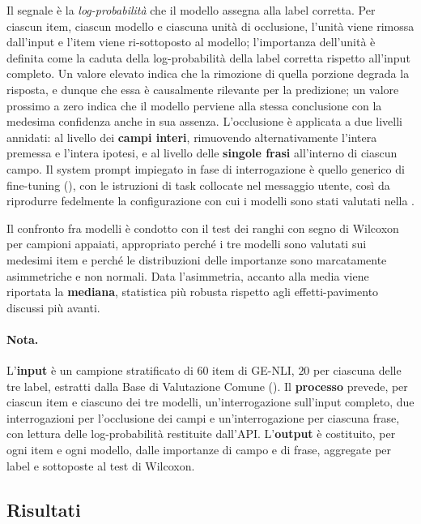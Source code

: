 \documentclass[pdflatex, sn-apa]{sn-jnl}%
\theoremstyle{thmstyleone}%
\theoremstyle{thmstyletwo}%
\theoremstyle{thmstylethree}%
\begin{document}
Il segnale è la \emph{log-probabilità} che il modello assegna alla label corretta.
Per ciascun item, ciascun modello e ciascuna unità di occlusione, l'unità viene
rimossa dall'input e l'item viene ri-sottoposto al modello; l'importanza
dell'unità è definita come la caduta della log-probabilità della label corretta
rispetto all'input completo. Un valore elevato indica che la rimozione di quella
porzione degrada la risposta, e dunque che essa è causalmente rilevante per la
predizione; un valore prossimo a zero indica che il modello perviene alla stessa
conclusione con la medesima confidenza anche in sua assenza. L'occlusione è
applicata a due livelli annidati: al livello dei \textbf{campi interi}, rimuovendo
alternativamente l'intera premessa e l'intera ipotesi, e al livello delle
\textbf{singole frasi} all'interno di ciascun campo. Il system prompt impiegato in
fase di interrogazione è quello generico di fine-tuning (), con le
istruzioni di task collocate nel messaggio utente, così da riprodurre fedelmente la
configurazione con cui i modelli sono stati valutati nella .

Il confronto fra modelli è condotto con il test dei ranghi con segno di Wilcoxon
per campioni appaiati, appropriato perché i tre modelli sono valutati sui medesimi
item e perché le distribuzioni delle importanze sono marcatamente asimmetriche e
non normali. Data l'asimmetria, accanto alla media viene riportata la
\textbf{mediana}, statistica più robusta rispetto agli effetti-pavimento discussi
più avanti.

\paragraph{Nota.}
L'\textbf{input} è un campione stratificato di $60$ item di GE-NLI, $20$ per
ciascuna delle tre label, estratti dalla Base di Valutazione Comune
(). Il \textbf{processo} prevede, per ciascun item e ciascuno
dei tre modelli, un'interrogazione sull'input completo, due interrogazioni per
l'occlusione dei campi e un'interrogazione per ciascuna frase, con lettura delle
log-probabilità restituite dall'API. L'\textbf{output} è costituito, per ogni item
e ogni modello, dalle importanze di campo e di frase, aggregate per label e
sottoposte al test di Wilcoxon.

\subsection{Risultati}
\label{sec:xai:results}
\end{document}
